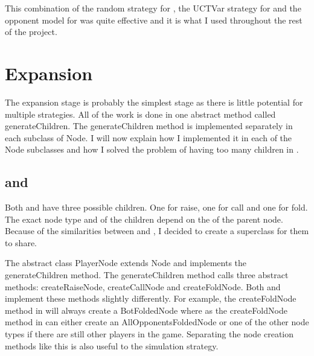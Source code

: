 This combination of the random strategy for \chances, the UCTVar strategy for \choices and the opponent model for \opps was quite effective and it is what I used throughout the rest of the project. 




\section{Expansion}								%



The expansion stage is probably the simplest stage as there is little potential for multiple strategies. All of the work is done in one abstract method called generateChildren. The generateChildren method is implemented separately in each subclass of Node. I will now explain how I implemented it in each of the Node subclasses and how I solved the problem of having too many children in \chance.


\subsection{\choice and \opp}						%

Both \choices and \opps have three possible children. One for raise, one for call and one for fold. The exact node type and \gs of the children depend on the \gs of the parent node. Because of the similarities between \choice and \opp, I decided to create a superclass for them to share. 

The abstract class PlayerNode extends Node and implements the \mbox{generateChildren} method. The generateChildren method calls three abstract methods: createRaiseNode, createCallNode and createFoldNode. Both \choice and \opp implement these methods slightly differently. 
For example, the createFoldNode method in \choice will always create a BotFoldedNode where as the createFoldNode method in \opp can either create an AllOpponentsFoldedNode or one of the other node types if there are still other players in the game.
Separating the node creation methods like this is also useful to the simulation strategy.


